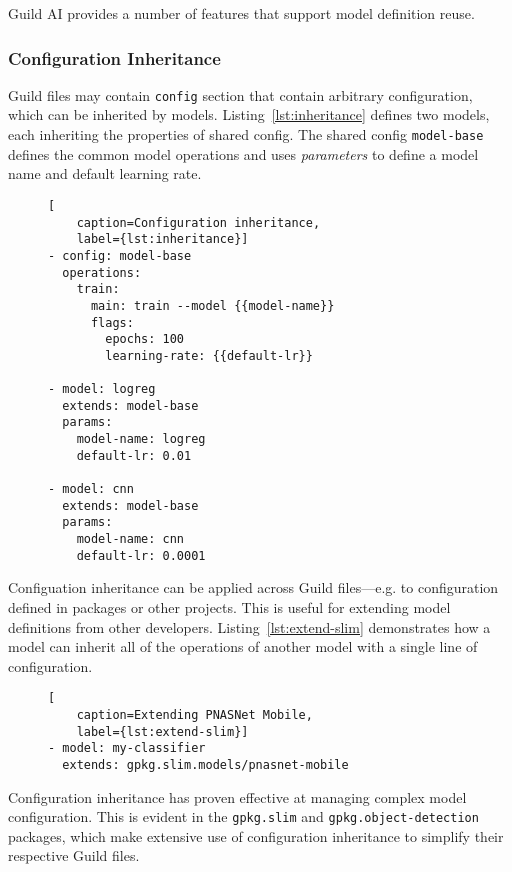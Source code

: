\documentclass{article}
\begin{document}
Guild AI provides a number of features that support model definition
reuse.

\subsubsection{Configuration Inheritance}

Guild files may contain \verb|config| section that contain arbitrary
configuration, which can be inherited by
models. Listing~\ref{lst:inheritance} defines two models, each
inheriting the properties of shared config. The shared config
\verb|model-base| defines the common model operations and uses
\emph{parameters} to define a model name and default learning rate.

\begin{figure}
\begin{lstlisting}[
    caption=Configuration inheritance,
    label={lst:inheritance}]
- config: model-base
  operations:
    train:
      main: train --model {{model-name}}
      flags:
        epochs: 100
        learning-rate: {{default-lr}}

- model: logreg
  extends: model-base
  params:
    model-name: logreg
    default-lr: 0.01

- model: cnn
  extends: model-base
  params:
    model-name: cnn
    default-lr: 0.0001
\end{lstlisting}
\end{figure}

Configuation inheritance can be applied across Guild files---e.g. to
configuration defined in packages or other projects. This is useful
for extending model definitions from other
developers. Listing~\ref{lst:extend-slim} demonstrates how a model can
inherit all of the operations of another model with a single line of
configuration.

\begin{figure}
\begin{lstlisting}[
    caption=Extending PNASNet Mobile,
    label={lst:extend-slim}]
- model: my-classifier
  extends: gpkg.slim.models/pnasnet-mobile
\end{lstlisting}
\end{figure}

Configuration inheritance has proven effective at managing complex
model configuration. This is evident in the \verb|gpkg.slim| and
\verb|gpkg.object-detection| packages, which make extensive use of
configuration inheritance to simplify their respective Guild files.
\end{document}
